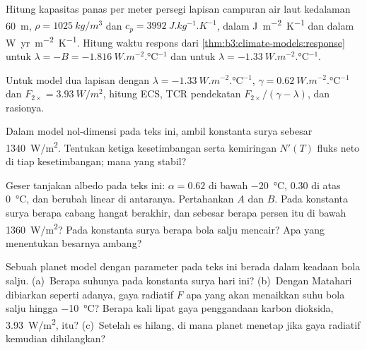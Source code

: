 \begin{exercise}[$\star$]\label{exo:b3:climate-models:3}
Hitung kapasitas panas per meter persegi lapisan campuran air laut
kedalaman \qty{60}{m}, $\rho = \qty{1025}{kg/m^3}$ dan $c_p = \qty{3992}{J.kg^{-1}.K^{-1}}$,
dalam \unit{J.m^{-2}.K^{-1}} dan dalam \unit{W.yr.m^{-2}.K^{-1}}. Hitung
waktu respons dari \cref{thm:b3:climate-models:response} untuk $\lambda = -B =
\qty{-1.816}{W.m^{-2}.\celsius^{-1}}$ dan untuk $\lambda =
\qty{-1.33}{W.m^{-2}.\celsius^{-1}}$.
\end{exercise}

\begin{exercise}[$\star$]\label{exo:b3:climate-models:4}
Untuk model dua lapisan dengan $\lambda = \qty{-1.33}{W.m^{-2}.\celsius^{-1}}$,
$\gamma = \qty{0.62}{W.m^{-2}.\celsius^{-1}}$ dan $F_{2\times} =
\qty{3.93}{W/m^2}$, hitung ECS, TCR pendekatan $F_{2\times}/
(\gamma - \lambda)$, dan rasionya.
\end{exercise}

\begin{exercise}[$\star\star$]\label{exo:b3:climate-models:5}
Dalam model nol-dimensi pada teks ini, ambil konstanta surya sebesar
\qty{1340}{W/m^2}. Tentukan ketiga kesetimbangan serta kemiringan $N'(T)$
fluks neto di tiap kesetimbangan; mana yang stabil?
\end{exercise}

\begin{exercise}[$\star\star$]\label{exo:b3:climate-models:6}
Geser tanjakan albedo pada teks ini: $\alpha = 0.62$ di bawah \qty{-20}{\celsius},
$0.30$ di atas \qty{0}{\celsius}, dan berubah linear di antaranya. Pertahankan $A$ dan $B$. Pada konstanta surya berapa
cabang hangat berakhir, dan sebesar berapa persen itu di bawah
\qty{1360}{W/m^2}? Pada konstanta surya berapa bola salju mencair?
Apa yang menentukan besarnya ambang?
\end{exercise}

\begin{exercise}[$\star\star$]\label{exo:b3:climate-models:7}
Sebuah planet model dengan parameter pada teks ini berada dalam keadaan bola salju.
(a)~Berapa suhunya pada konstanta surya hari ini? (b)~Dengan Matahari dibiarkan
seperti adanya, gaya radiatif $F$ apa yang akan menaikkan suhu bola salju hingga
\qty{-10}{\celsius}? Berapa kali lipat gaya penggandaan karbon
dioksida, \qty{3.93}{W/m^2}, itu? (c)~Setelah es hilang, di mana planet
menetap jika gaya radiatif kemudian dihilangkan?
\end{exercise}


